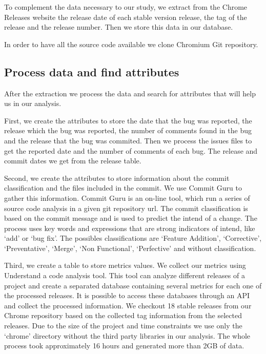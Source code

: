 To complement the data necessary to our study, we extract from the Chrome Releases website \cite{chrome_releases} the release date of each stable version release, the tag of the release and the release number. Then we store this data in our database.
 
In order to have all the source code available we clone Chromium Git repository. 

\subsection{Process data and find attributes}

After the extraction we process the data and search for attributes that will help us in our analysis. 

First, we create the attributes to store the date that the bug was reported, the release which the bug was reported, the number of comments found in the bug and the release that the bug was commited. Then we process the issues files to get the reported date and the number of comments of each bug. The release and commit dates we get from the release table. 

Second, we create the attributes to store information about the commit classification and the files included in the commit. We use Commit Guru\cite{commit_guru} to gather this information. Commit Guru is an on-line tool, which run a series of source code analysis in a given git repository url. The commit classification is based on the commit message and is used to predict the intend of a change. The process uses key words and expressions that are strong indicators of intend, like `add' or `bug fix'. The possibles classifications are `Feature Addition', `Corrective', `Preventative', `Merge', `Non Functional', `Perfective' and without classification.

Third, we create a table to store metrics values. We collect our metrics using Understand a code analysis tool. This tool can analyze different releases of a project and create a separated database containing several metrics \cite{understand_metrics} for each one of the processed releases. It is possible to access these databases through an API and collect the processed information. We checkout 18 stable releases from our Chrome repository based on the collected tag information from the selected releases. Due to the size of the project and time constraints we use only the `chrome' directory without the third party libraries in our analysis. The whole process took approximately 16 hours and generated more than 2GB of data. 

